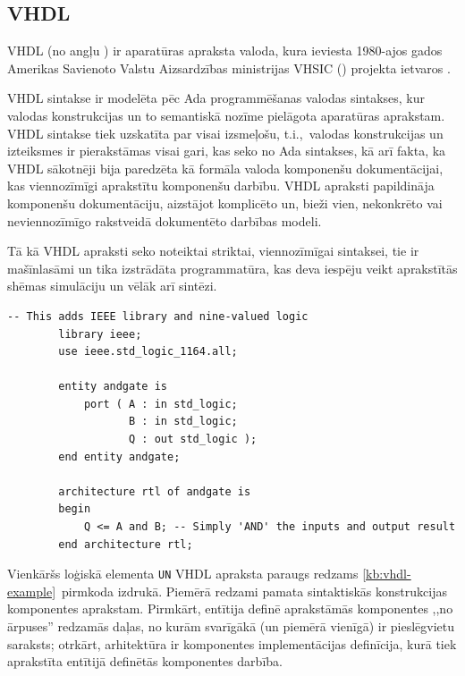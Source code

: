 \subsection{VHDL} \label{sec:vhdl}
	VHDL (no angļu ) ir aparatūras apraksta
	valoda, kura ieviesta 1980-ajos gados Amerikas Savienoto Valstu
	Aizsardzības ministrijas
	VHSIC ()
	projekta ietvaros \cite[1.~lpp.]{Perry-VHDL}\cite[141.~lpp.]{VHSIC}.

	VHDL sintakse ir modelēta pēc Ada programmēšanas valodas sintakses, kur
	valodas konstrukcijas un to semantiskā nozīme pielāgota aparatūras aprakstam.
	VHDL sintakse tiek uzskatīta par visai izsmeļošu, t.i.,~valodas 
	konstrukcijas un izteiksmes ir pierakstāmas visai gari, kas seko no
	Ada sintakses, kā arī fakta, ka VHDL sākotnēji bija paredzēta kā 
	formāla valoda komponenšu dokumentācijai, kas viennozīmīgi aprakstītu
	komponenšu darbību.
	VHDL apraksti papildināja komponenšu dokumentāciju,
	aizstājot komplicēto un, bieži vien,
	nekonkrēto vai neviennozīmīgo rakstveidā dokumentēto darbības modeli.
	
	Tā kā VHDL apraksti seko noteiktai striktai, viennozīmīgai sintaksei,
	tie ir mašīnlasāmi un tika izstrādāta programmatūra, kas deva
	iespēju veikt aprakstītās shēmas simulāciju un vēlāk arī sintēzi.

	\begin{lstlisting}[language={[qucs]VHDL},label=kb:vhdl-example,gobble=4,%
			caption={VHDL apraksts loģiskajam \texttt{UN} elementam.}]
		-- This adds IEEE library and nine-valued logic
		library ieee;
		use ieee.std_logic_1164.all;
		
		entity andgate is
			port ( A : in std_logic;
			       B : in std_logic;
			       Q : out std_logic );
		end entity andgate;
		
		architecture rtl of andgate is
		begin
			Q <= A and B; -- Simply 'AND' the inputs and output result
		end architecture rtl;
	\end{lstlisting}

	Vienkāršs loģiskā elementa \texttt{UN} VHDL apraksta paraugs redzams
	\ref{kb:vhdl-example}~pirmkoda izdrukā. Piemērā redzami pamata sintaktiskās
	konstrukcijas komponentes aprakstam.
	Pirmkārt, entītija definē aprakstāmās komponentes ,,no ārpuses''
	redzamās daļas, no kurām svarīgākā (un piemērā vienīgā) ir pieslēgvietu
	saraksts; otrkārt, arhitektūra ir komponentes implementācijas definīcija,
	kurā tiek aprakstīta entītijā definētās komponentes darbība.

